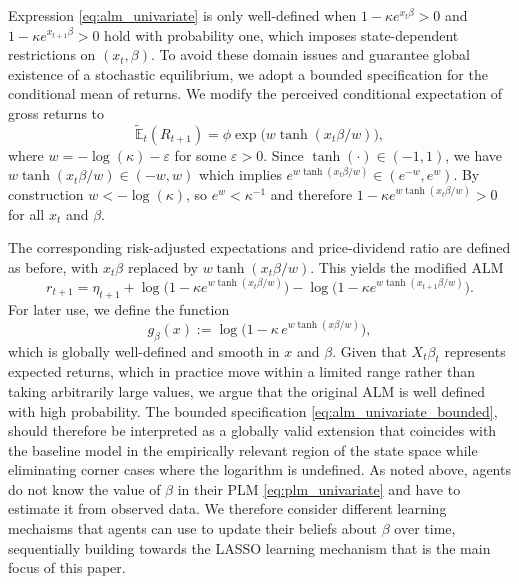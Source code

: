 Expression \eqref{eq:alm_univariate} is only well-defined when $1 - \kappa e^{x_t \beta} > 0$ and $1 - \kappa e^{x_{t+1} \beta} > 0$ hold with probability one, which imposes state-dependent restrictions on $(x_t,\beta)$. To avoid these domain issues and guarantee global existence of a stochastic equilibrium, we adopt a bounded specification for the conditional mean of returns. We modify the perceived conditional expectation of gross returns to
\begin{equation}
    \tilde{\mathbb{E}}_t(R_{t+1}) = \phi \exp\bigl( w \tanh(x_t \beta / w) \bigr),
\end{equation}
where $w = -\log(\kappa) - \varepsilon$ for some $\varepsilon > 0$. Since $\tanh(\cdot) \in (-1,1)$, we have $w \tanh(x_t \beta / w) \in (-w,w)$ which implies $e^{w \tanh(x_t \beta / w)} \in (e^{-w}, e^{w})$. By construction $w < -\log(\kappa)$, so $e^{w} < \kappa^{-1}$ and therefore $1 - \kappa e^{w \tanh(x_t \beta / w)} > 0$ for all $x_t$ and $\beta$.

The corresponding risk-adjusted expectations and price-dividend ratio are defined as before, with $x_t \beta$ replaced by $w \tanh(x_t \beta / w)$. This yields the modified ALM
\begin{equation}\label{eq:alm_univariate_bounded}
    r_{t+1} = \eta_{t+1}
    + \log\bigl(1 - \kappa e^{w \tanh(x_t \beta / w)}\bigr)
    - \log\bigl(1 - \kappa e^{w \tanh(x_{t+1} \beta / w)}\bigr).
\end{equation}
For later use, we define the function
\begin{equation}\label{eq:g_beta_def}
    g_{\beta}(x) 
    := \log\bigl(1 - \kappa\, e^{w \tanh(x \beta/w)}\bigr),
\end{equation}
which is globally well-defined and smooth in $x$ and $\beta$. Given that $X_t \beta_t$ represents expected returns, which in practice move within a limited range rather than taking arbitrarily large values, we argue that the original ALM is well defined with high probability.
The bounded specification \eqref{eq:alm_univariate_bounded}, should therefore be interpreted as a globally valid extension that coincides with the baseline model in the empirically relevant region of the state space while eliminating corner cases where the logarithm is undefined.
As noted above, agents do not know the value of $\beta$ in their PLM \eqref{eq:plm_univariate} and have to estimate it from observed data.
We therefore consider different learning mechaisms that agents can use to update their beliefs about $\beta$ over time, sequentially building towards the LASSO learning mechanism that is the main focus of this paper.

